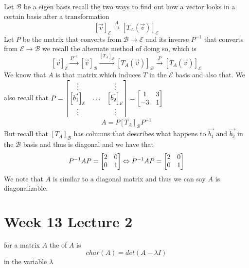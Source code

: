 \documentclass[11pt]{book}
\begin{document}
Let $\mathcal{B} $ be a eigen basis recall the two ways to find out how a vector looks in a certain basis after a transformation 
\[
    \left[ \vec{v}  \right]_{\mathcal{E}} \xrightarrow{A} \left[ T_{A} \left(\vec{v} \right)  \right]_{\mathcal{E}} 
\]
Let $P$ be the matrix that converts from $\mathcal{B} \to \mathcal{E} $ and its inverse $P^{-1} $ that converts from $\mathcal{E} \to \mathcal{B}  $ we recall the alternate method of doing so, which is 
\[
\left[ \vec{v}  \right]_{\mathcal{E}} \xrightarrow{P^{-1} } \left[ \vec{v}  \right]_{\mathcal{B}} \xrightarrow{\left[ T_{A}  \right]_{\mathcal{B}} } \left[ T_{A} \left(\vec{v} \right)  \right]_{\mathcal{B}} \xrightarrow{P} \left[ T_{A} \left(\vec{v} \right)  \right]_{\mathcal{E}} 
\]
We know that $A$ is that matrix which induces $T$ in the $\mathcal{E} $ basis and also that. We also recall that $P= \mat[b]{ \vdots  &  & \vdots  \\ \left[ \vec{b_1}  \right]_{\mathcal{E}}  & \ldots  & \left[ \vec{b_2}  \right]_{\mathcal{E}}  \\ \vdots  &  & \vdots  } = \mat[b]{ 1 & 3 \\ -3 & 1 }$ 
\[
A= P\left[ T_{A}  \right]_{\mathcal{B}} P^{-1} 
\]
But recall that $\left[ T_{A}  \right]_{\mathcal{B}} $ has columns that describes what happens to $\vec{b_1} \text{ and } \vec{b_2}  $ in the $\mathcal{B} $ basis and thus is diagonal and we have that
\[
P^{-1} AP= \mat[b]{ 2 & 0 \\ 0 & 1 } \Leftrightarrow P^{-1} A P= \mat[b]{ 2 & 0 \\ 0 & 1 }
\]
We note that $A$ is similar to a diagonal matrix and thus we can say $A$ is diagonalizable.




\section{Week 13 Lecture 2}%
\label{sec:week_13_lecture_2}

\begin{defn}\label{defn:characteristic_polynomial}
    for a matrix $A$ the  of $A$ is \[
    char\left(A\right) = \mathit{det} \left(A - \lambda I\right) 
    \]
    in the variable $\lambda $ 
\end{defn}
\end{document}
